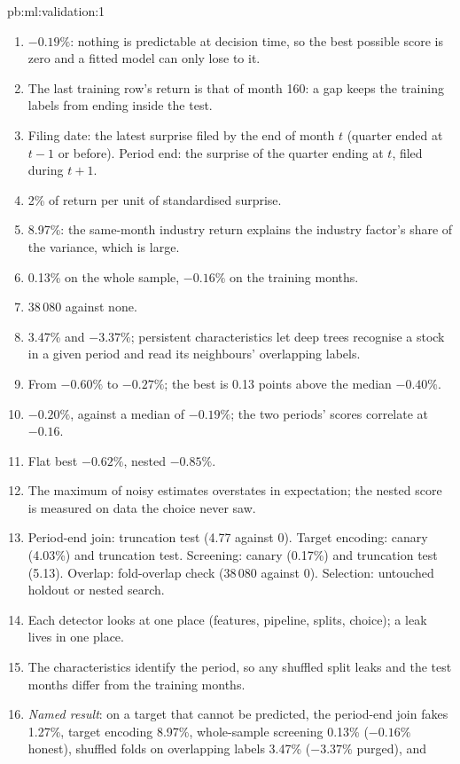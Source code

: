 \begin{solution}{pb:ml:validation:1}
\begin{enumerate}
\item $-0.19\%$: nothing is predictable at decision time, so the best possible score is zero and a fitted model can only
lose to it.
\item The last training row's return is that of month 160: a gap keeps the training labels from ending inside the test.
\item Filing date: the latest surprise filed by the end of month $t$ (quarter ended at $t-1$ or before). Period end: the
surprise of the quarter ending at $t$, filed during $t+1$.
\item 2\% of return per unit of standardised surprise.
\item 8.97\%: the same-month industry return explains the industry factor's share of the variance, which is large.
\item 0.13\% on the whole sample, $-0.16\%$ on the training months.
\item 38\,080 against none.
\item 3.47\% and $-3.37\%$; persistent characteristics let deep trees recognise a stock in a given period and read its
neighbours' overlapping labels.
\item From $-0.60\%$ to $-0.27\%$; the best is 0.13 points above the median $-0.40\%$.
\item $-0.20\%$, against a median of $-0.19\%$; the two periods' scores correlate at $-0.16$.
\item Flat best $-0.62\%$, nested $-0.85\%$.
\item The maximum of noisy estimates overstates in expectation; the nested score is measured on data the choice never
saw.
\item Period-end join: truncation test (4.77 against 0). Target encoding: canary (4.03\%) and truncation test.
Screening: canary (0.17\%) and truncation test (5.13). Overlap: fold-overlap check (38\,080 against 0). Selection:
untouched holdout or nested search.
\item Each detector looks at one place (features, pipeline, splits, choice); a leak lives in one place.
\item The characteristics identify the period, so any shuffled split leaks and the test months differ from the training
months.
\item \emph{Named result}: on a target that cannot be predicted, the period-end join fakes 1.27\%, target encoding 8.97\%,
whole-sample screening 0.13\% ($-0.16\%$ honest), shuffled folds on overlapping labels 3.47\% ($-3.37\%$ purged), and

\end{enumerate}
\end{solution}

